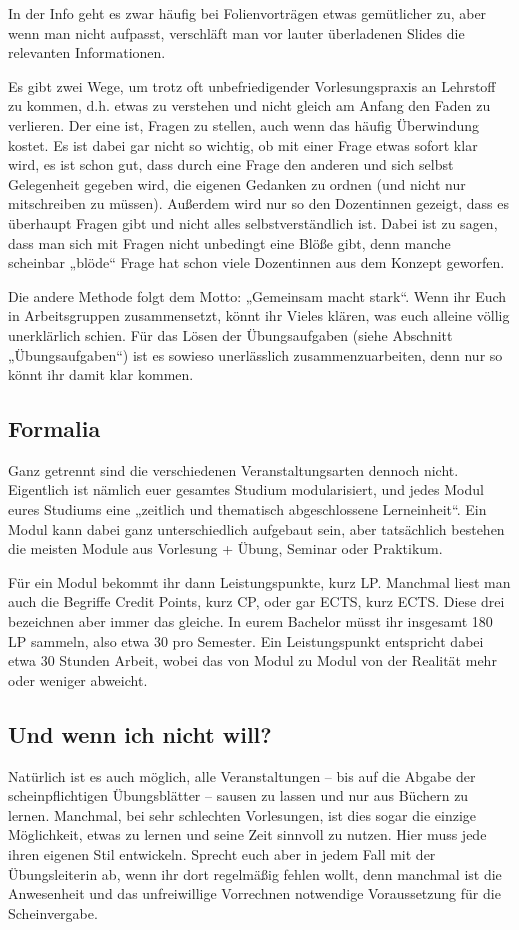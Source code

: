 In der Info geht es zwar häufig bei Folienvorträgen etwas gemütlicher zu, aber wenn man nicht aufpasst, verschläft man vor lauter überladenen Slides die relevanten Informationen.

Es gibt zwei Wege, um trotz oft unbefriedigender Vorlesungspraxis an Lehrstoff zu kommen, d.h. etwas zu verstehen und nicht gleich am Anfang den Faden zu verlieren. Der eine ist, Fragen zu stellen, auch wenn das häufig Überwindung kostet. Es ist dabei gar nicht so wichtig, ob mit einer Frage etwas sofort klar wird, es ist schon gut, dass durch eine Frage den anderen und sich selbst Gelegenheit gegeben wird, die eigenen Gedanken zu ordnen (und nicht nur mitschreiben zu müssen). Außerdem wird nur so den Dozentinnen gezeigt, dass es überhaupt Fragen gibt und nicht alles selbstverständlich ist. Dabei ist zu sagen, dass man sich mit Fragen nicht unbedingt eine Blöße gibt, denn manche scheinbar „blöde“ Frage hat schon viele Dozentinnen aus dem Konzept geworfen.

Die andere Methode folgt dem Motto: „Gemeinsam macht stark“. Wenn ihr Euch in Arbeitsgruppen zusammensetzt, könnt ihr Vieles klären, was euch alleine völlig unerklärlich schien. Für das Lösen der Übungsaufgaben (siehe Abschnitt „Übungsaufgaben“) ist es sowieso unerlässlich zusammenzuarbeiten, denn nur so könnt ihr damit klar kommen.

\subsection{Formalia}

Ganz getrennt sind die verschiedenen Veranstaltungsarten dennoch nicht. Eigentlich ist nämlich euer gesamtes Studium modularisiert, und jedes Modul eures Studiums eine „zeitlich und thematisch abgeschlossene Lerneinheit“. Ein Modul kann dabei ganz unterschiedlich aufgebaut sein, aber tatsächlich bestehen die meisten Module aus Vorlesung + Übung, Seminar oder Praktikum.

Für ein Modul bekommt ihr dann Leistungspunkte, kurz \gls{LP}. Manchmal liest man auch die Begriffe Credit Points, kurz \gls{CP}, oder gar \gls{ECTS}, kurz ECTS. Diese drei bezeichnen aber immer das gleiche. In eurem Bachelor müsst ihr insgesamt 180 \gls{LP} sammeln, also etwa 30 pro Semester. Ein Leistungspunkt entspricht dabei etwa 30 Stunden Arbeit, wobei das von Modul zu Modul von der Realität mehr oder weniger abweicht.

\subsection{Und wenn ich nicht will?}

Natürlich ist es auch möglich, alle Veranstaltungen -- bis auf die Abgabe der scheinpflichtigen Übungsblätter -- sausen zu lassen und nur aus Büchern zu lernen. Manchmal, bei sehr schlechten Vorlesungen, ist dies sogar die einzige Möglichkeit, etwas zu lernen und seine Zeit sinnvoll zu nutzen. Hier muss jede ihren eigenen Stil entwickeln. Sprecht euch aber in jedem Fall mit der Übungsleiterin ab, wenn ihr dort regelmäßig fehlen wollt, denn manchmal ist die Anwesenheit und das unfreiwillige Vorrechnen notwendige Voraussetzung für die Scheinvergabe.
